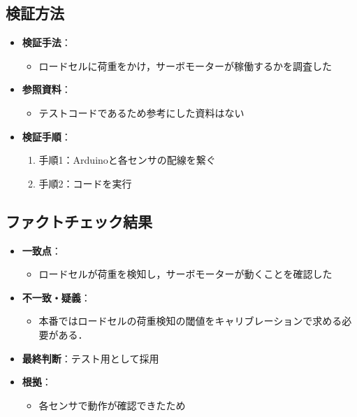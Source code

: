 \documentclass[a4paper,12pt]{ltjsarticle}
\begin{document}
\subsection{検証方法}

\begin{itemize}
  \item \textbf{検証手法}：
    \begin{itemize}
      \item ロードセルに荷重をかけ，サーボモーターが稼働するかを調査した
    \end{itemize}
  \item \textbf{参照資料}：
    \begin{itemize}
      \item テストコードであるため参考にした資料はない
    \end{itemize}
  \item \textbf{検証手順}：
    \begin{enumerate}
      \item 手順1：Arduinoと各センサの配線を繋ぐ
      \item 手順2：コードを実行
    \end{enumerate}
\end{itemize}

\subsection{ファクトチェック結果}
\begin{itemize}
  \item \textbf{一致点}：
    \begin{itemize}
      \item ロードセルが荷重を検知し，サーボモーターが動くことを確認した
    \end{itemize}
  \item \textbf{不一致・疑義}：
    \begin{itemize}
      \item 本番ではロードセルの荷重検知の閾値をキャリブレーションで求める必要がある．
    \end{itemize}
  \item \textbf{最終判断}：テスト用として採用
  \item \textbf{根拠}：
    \begin{itemize}
      \item 各センサで動作が確認できたため
    \end{itemize}
\end{itemize}
\end{document}
